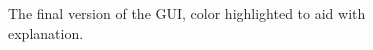 \documentclass[a4paper]{article}
\begin{document}
\begin{figure}[!h]
  \centering
  \hfill
  \hfill
  \caption{The final version of the GUI, color highlighted to aid with explanation.}
  \label{fig:results}
\end{figure}
\end{document}
